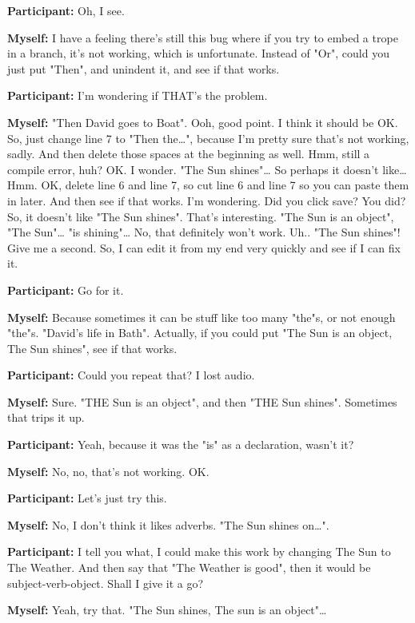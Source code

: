 \documentclass[11pt]{report}
\begin{document}
\begin{linenumbers}
\textbf{Participant:} Oh, I see.

\textbf{Myself:} I have a feeling there's still this bug where if you try to embed a trope in a branch, it's not working, which is unfortunate. Instead of "Or", could you just put "Then", and unindent it, and see if that works.

\textbf{Participant:} I'm wondering if THAT's the problem.

\textbf{Myself:} "Then David goes to Boat". Ooh, good point. I think it should be OK. So, just change line 7 to "Then the\ldots{}", because I'm pretty sure that's not working, sadly. And then delete those spaces at the beginning as well. Hmm, still a compile error, huh? OK. I wonder. "The Sun shines"\ldots{} So perhaps it doesn't like\ldots{} Hmm. OK, delete line 6 and line 7, so cut line 6 and line 7 so you can paste them in later. And then see if that works. I'm wondering. Did you click save? You did? So, it doesn't like "The Sun shines". That's interesting. "The Sun is an object", "The Sun"\ldots{} "is shining"\ldots{} No, that definitely won't work. Uh.. "The Sun shines"! Give me a second. So, I can edit it from my end very quickly and see if I can fix it.

\textbf{Participant:} Go for it.

\textbf{Myself:} Because sometimes it can be stuff like too many "the"s, or not
enough "the"s. "David's life in Bath". Actually, if you could put "The Sun is an
object, The Sun shines", see if that works.

\textbf{Participant:} Could you repeat that? I lost audio.

\textbf{Myself:} Sure. "THE Sun is an object", and then "THE Sun shines". Sometimes that trips it up.

\textbf{Participant:} Yeah, because it was the "is" as a declaration, wasn't it?

\textbf{Myself:} No, no, that's not working. OK.

\textbf{Participant:} Let's just try this.

\textbf{Myself:} No, I don't think it likes adverbs. "The Sun shines on\ldots{}".

\textbf{Participant:} I tell you what, I could make this work by changing The Sun to The Weather. And then say that "The Weather is good", then it would be subject-verb-object. Shall I give it a go?

\textbf{Myself:} Yeah, try that. "The Sun shines, The sun is an object"\ldots{}


\end{linenumbers}
\end{document}
